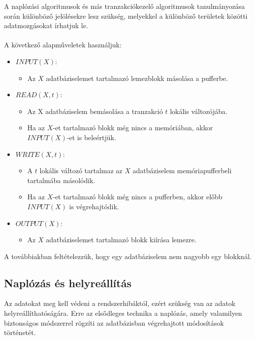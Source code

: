 \documentclass[12pt,margin=0px]{article}
\begin{document}
	\noindent A naplózási algoritmusok és más tranzakciókezelő algoritmusok tanulmányozása során különböző jelölésekre lesz szükség, melyekkel a különböző területek közötti adatmozgásokat írhatjuk le.\\\\
    \noindent A következő alapműveletek használjuk:
	\begin{itemize}
		\item	$INPUT(X)$:
        \begin{itemize}
            \item Az $X$ adatbáziselemet tartalmazó lemezblokk másolása a pufferbe.
        \end{itemize}
		\item	$READ(X,t)$:
        \begin{itemize}
            \item Az X adatbáziselem bemásolása a tranzakció $t$ lokális változójába.
            \item Ha az $X$-et tartalmazó blokk még nincs a memóriában, akkor $INPUT(X)$-et is beleértjük.
        \end{itemize}
		\item	$WRITE(X,t)$:
        \begin{itemize}
            \item A $t$ lokális változó tartalmaz az $X$ adatbáziselem memóriapufferbeli tartalmába másolódik.
            \item Ha az $X$-et tartalmazó blokk még nincs a pufferben, akkor előbb $INPUT(X)$ is végrehajtódik.
        \end{itemize}
		\item	$OUTPUT(X)$:
        \begin{itemize}
            \item Az $X$ adatbáziselemet tartalmazó blokk kiírása lemezre.
        \end{itemize}
	\end{itemize}

	\noindent A továbbiakban feltételezzük, hogy egy adatbáziselem nem nagyobb egy blokknál.
	
	\subsection*{Naplózás és helyreállítás}
	
	Az adatokat meg kell védeni a rendszerhibáktól, ezért szükség van az adatok helyreállíthatóságára. Erre az elsődleges technika a naplózás, amely valamilyen biztonságos módszerrel rögzíti az adatbázisban végrehajtott módosítások történetét.\\
	
\end{document}
